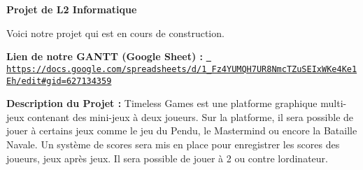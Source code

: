 \label{index_md__info_etu_l2info_s200470_Timeless_Games_README}%
%
{\bfseries{Projet de L2 Informatique}}

Voici notre projet qui est en cours de construction.

{\bfseries{Lien de notre GANTT (Google Sheet) \+:}} \href{https://docs.google.com/spreadsheets/d/1_Fz4YUMQH7UR8NmcTZuSEIxWKe4Ke1Eh/edit\#gid=627134359}{\texttt{ https\+://docs.\+google.\+com/spreadsheets/d/1\+\_\+\+Fz4\+YUMQH7\+UR8\+Nmc\+TZu\+SEIx\+WKe4\+Ke1\+Eh/edit\#gid=627134359}}

{\bfseries{Description du Projet \+:}} Timeless Games est une platforme graphique multi-\/jeux contenant des mini-\/jeux à deux joueurs. Sur la platforme, il sera possible de jouer à certains jeux comme le jeu du Pendu, le Mastermind ou encore la Bataille Navale. Un système de scores sera mis en place pour enregistrer les scores des joueurs, jeux après jeux. Il sera possible de jouer à 2 ou contre l\textquotesingle{}ordinateur. 